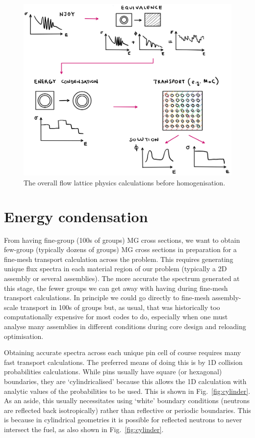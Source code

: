 \documentclass{article}
\begin{document}
\begin{figure}[h!]
	\centering
	\includegraphics[scale=0.60]{./images/summary_lattice_physics.png} 
	\caption{The overall flow lattice physics calculations before homogenisation.} 
	\label{fig:lattice_physics}
\end{figure}

\section{Energy condensation}

From having fine-group (100s of groups) MG cross sections, we want to obtain few-group (typically dozens of groups) MG cross sections in preparation for a fine-mesh transport calculation across the problem. This requires generating unique flux spectra in each material region of our problem (typically a 2D assembly or several assemblies). The more accurate the spectrum generated at this stage, the fewer groups we can get away with having during fine-mesh transport calculations. In principle we could go directly to fine-mesh assembly-scale transport in 100s of groups but, as usual, that was historically too computationally expensive for most codes to do, especially when one must analyse many assemblies in different conditions during core design and reloading optimisation. 

Obtaining accurate spectra across each unique pin cell of course requires many fast transport calculations. The preferred means of doing this is by 1D collision probabilities calculations. While pins usually have square (or hexagonal) boundaries, they are `cylindricalised' because this allows the 1D calculation with analytic values of the probabilities to be used. This is shown in Fig.~\ref{fig:cylinder}. As an aside, this usually necessitates using `white' boundary conditions (neutrons are reflected back isotropically) rather than reflective or periodic boundaries. This is because in cylindrical geometries it is possible for reflected neutrons to never intersect the fuel, as also shown in Fig.~\ref{fig:cylinder}.
\end{document}
